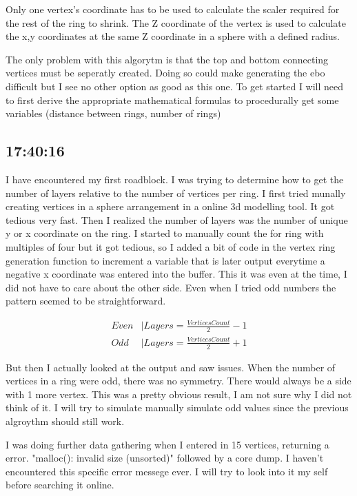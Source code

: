 \documentclass{article}
\begin{document}
Only one vertex's coordinate has to be used to calculate the scaler required for the rest of the ring 
to shrink. The Z coordinate of the vertex is used to calculate the x,y coordinates at the same Z
coordinate in a sphere with a defined radius.

The only problem with this algorytm is that the top and bottom connecting vertices must be seperatly
created. Doing so could make generating the ebo difficult but I see no other option as good as this 
one. To get started I will need to first derive the appropriate mathematical formulas to procedurally
get some variables (distance between rings, number of rings)

\subsection*{17:40:16}
I have encountered my first roadblock. I was trying to determine how to get the number of layers 
relative to the number of vertices per ring. I first tried munally creating vertices in a sphere
arrangement in a online 3d modelling tool. It got tedious very fast. Then I realized the number of
layers was the number of unique y or x coordinate on the ring. I started to manually count the for
ring with multiples of four but it got tedious, so I added a bit of code in the vertex ring
generation function to increment a variable that is later output everytime a negative x coordinate
was entered into the buffer. This it was even at the time, I did not have to care about the other
side. Even when I tried odd numbers the pattern seemed to be straightforward.

\begin{align}
    Even &| Layers = \frac{VerticesCount}{2} - 1\\
    Odd  &| Layers = \frac{VerticesCount}{2} + 1
\end{align}

But then I actually looked at the output and saw issues. When the number of vertices in a ring 
were odd, there was no symmetry. There would always be a side with 1 more vertex. This was a 
pretty obvious result, I am not sure why I did not think of it. I will try to simulate manually 
simulate odd values since the previous algroythm should still work. 

I was doing further data gathering when I entered in 15 vertices, returning a error. "malloc():
invalid size (unsorted)" followed by a core dump. I haven't encountered this specific error
messege ever. I will try to look into it my self before searching it online.
\end{document}

